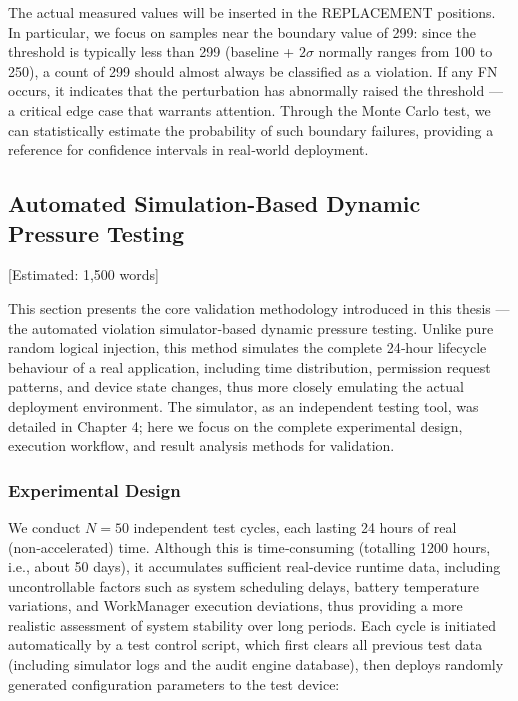 The actual measured values will be inserted in the REPLACEMENT positions. In particular, we focus on samples near the boundary value of 299: since the threshold is typically less than 299 (baseline + $2\sigma$ normally ranges from 100 to 250), a count of 299 should almost always be classified as a violation. If any FN occurs, it indicates that the perturbation has abnormally raised the threshold — a critical edge case that warrants attention. Through the Monte Carlo test, we can statistically estimate the probability of such boundary failures, providing a reference for confidence intervals in real‑world deployment.

\subsection{Automated Simulation-Based Dynamic Pressure Testing} [Estimated: 1,500 words]

This section presents the core validation methodology introduced in this thesis — the automated violation simulator‑based dynamic pressure testing. Unlike pure random logical injection, this method simulates the complete 24‑hour lifecycle behaviour of a real application, including time distribution, permission request patterns, and device state changes, thus more closely emulating the actual deployment environment. The simulator, as an independent testing tool, was detailed in Chapter 4; here we focus on the complete experimental design, execution workflow, and result analysis methods for validation.

\subsubsection{Experimental Design}

We conduct $N=50$ independent test cycles, each lasting 24 hours of real (non‑accelerated) time. Although this is time‑consuming (totalling 1200 hours, i.e., about 50 days), it accumulates sufficient real‑device runtime data, including uncontrollable factors such as system scheduling delays, battery temperature variations, and WorkManager execution deviations, thus providing a more realistic assessment of system stability over long periods. Each cycle is initiated automatically by a test control script, which first clears all previous test data (including simulator logs and the audit engine database), then deploys randomly generated configuration parameters to the test device:

